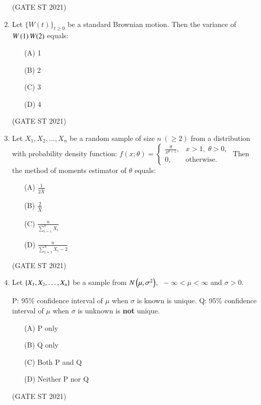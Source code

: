 \documentclass[journal,12pt,onecolumn]{IEEEtran}
\theoremstyle{remark}
\begin{document}
\begin{enumerate}
\hfill (GATE ST 2021) \\


\item
Let $\{W(t)\}_{t \geq 0}$ be a standard Brownian motion.  
Then the variance of $W\left(1\right) W(2)$ equals:
\begin{enumerate}
\item[(A)] 1
\item[(B)] 2
\item[(C)] 3
\item[(D)] 4
\end{enumerate}

\hfill (GATE ST 2021) \\

\item
Let $X_1, X_2, \dots, X_n$ be a random sample of size $n \ (\geq 2)$ from a distribution with probability density function:
$
f(x; \theta) =
\begin{cases}
\frac{\theta}{x^{\theta+1}}, & x > 1, \; \theta > 0, \\
0, & \text{otherwise}.
\end{cases}
$
Then the method of moments estimator of $\theta$ equals:
\begin{enumerate}
\item[(A)] $\frac{1}{2\bar{X}}$
\item[(B)] $\frac{2}{\bar{X}}$
\item[(C)] $\frac{n}{\sum_{i=1}^n X_i}$
\item[(D)] $\frac{n}{\sum_{i=1}^n X_i - 2}$
\end{enumerate}

\hfill (GATE ST 2021) \\

\item
Let $\left\{ X_1, X_2, \dots, X_n \right\}$ be a sample from $N\left(\mu,\sigma^2\right)$, $\ -\infty < \mu < \infty$ and $\sigma > 0$.

P: 95\% confidence interval of $\mu$ when $\sigma$ is known is unique.  
Q: 95\% confidence interval of $\mu$ when $\sigma$ is unknown is \textbf{not} unique.

\begin{enumerate}
\item[(A)] P only
\item[(B)] Q only
\item[(C)] Both P and Q
\item[(D)] Neither P nor Q
\end{enumerate}
\hfill (GATE ST 2021) \\



\end{enumerate}
\end{document}
